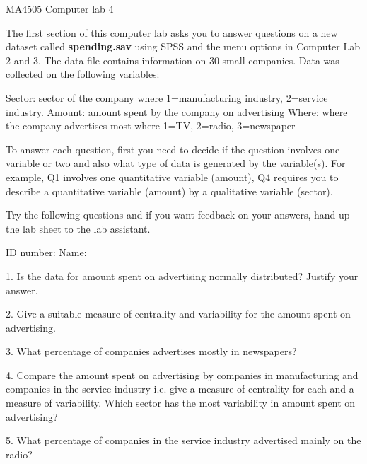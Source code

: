 MA4505   Computer lab 4
 
The first section of this computer lab asks you to answer questions on a new dataset called \textbf{spending.sav} using SPSS and the menu options in Computer Lab 2 and 3. The data file contains information on 30 small companies. Data was collected on the following variables:
 
Sector: sector of the company where 1=manufacturing industry, 2=service industry.
Amount: amount spent by the company on advertising
Where: where the company advertises most where 1=TV, 2=radio, 3=newspaper
 
 
To answer each question, first you need to decide if the question involves one variable or two and also what type of data is generated by the variable(s). For example, Q1 involves one quantitative variable (amount), Q4 requires you to describe a quantitative variable (amount) by a qualitative variable (sector).
 
 
Try the following questions and if you want feedback on your answers, hand up the lab sheet to the lab assistant.
 
 
ID number:      Name:
 
 
1. Is the data for amount spent on advertising normally distributed? Justify your answer.
 
 
 
 
 
 
 
2. Give a suitable measure of centrality and variability for the amount spent on advertising.
 
 
 
 
 
3. What percentage of companies advertises mostly in newspapers?
 
 
 
 
4. Compare the amount spent on advertising by companies in manufacturing and companies in the service industry i.e. give a measure of centrality for each and a measure of variability. Which sector has the most variability in amount spent on advertising?
 
 
 
 
 
 
 
 
5. What percentage of companies in the service industry advertised mainly on the radio?
 
 
 
 
 
